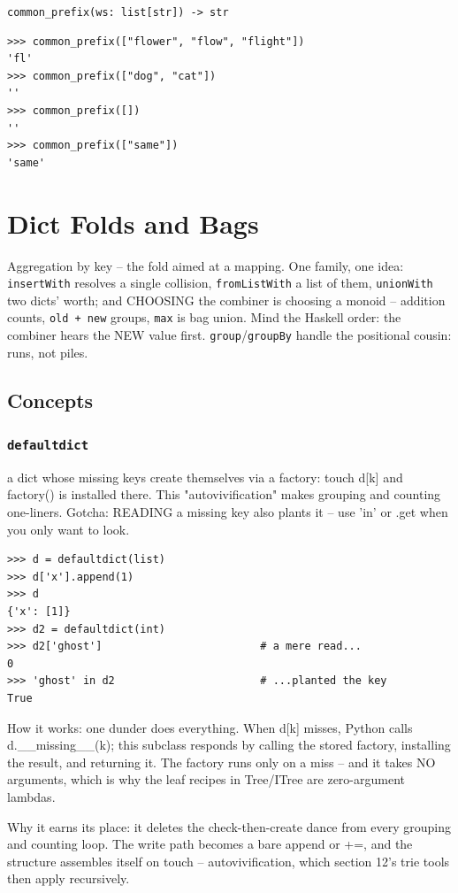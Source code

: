 \documentclass[10pt,letterpaper]{book}
\begin{document}
\noindent\texttt{common\_prefix(ws: list[str]) -> str}
\begin{lstlisting}[style=ex]
>>> common_prefix(["flower", "flow", "flight"])
'fl'
>>> common_prefix(["dog", "cat"])
''
>>> common_prefix([])
''
>>> common_prefix(["same"])
'same'
\end{lstlisting}
\clearpage
\chapter{Dict Folds and Bags}

Aggregation by key -- the fold aimed at a mapping. One family, one idea:
\texttt{insertWith} resolves a single collision, \texttt{fromListWith} a
list of them, \texttt{unionWith} two dicts' worth; and CHOOSING the combiner
is choosing a monoid -- addition counts, \texttt{old + new} groups,
\texttt{max} is bag union. Mind the Haskell order: the combiner hears the
NEW value first. \texttt{group}/\texttt{groupBy} handle the positional
cousin: runs, not piles.
\section{Concepts}
\subsection{\texttt{defaultdict}}\label{def:defaultdict}
a dict whose missing keys create themselves via a factory: touch d[k] and factory() is installed there. This "autovivification" makes grouping and counting one-liners. Gotcha: READING a missing key also plants it -- use 'in' or .get when you only want to look.
\begin{lstlisting}[style=ex]
>>> d = defaultdict(list)
>>> d['x'].append(1)
>>> d
{'x': [1]}
>>> d2 = defaultdict(int)
>>> d2['ghost']                         # a mere read...
0
>>> 'ghost' in d2                       # ...planted the key
True
\end{lstlisting}

How it works: one dunder does everything. When d[k] misses, Python calls d.\_\_missing\_\_(k); this subclass responds by calling the stored factory, installing the result, and returning it. The factory runs only on a miss -- and it takes NO arguments, which is why the leaf recipes in Tree/ITree are zero-argument lambdas.


Why it earns its place: it deletes the check-then-create dance from every grouping and counting loop. The write path becomes a bare append or +=, and the structure assembles itself on touch -- autovivification, which section 12's trie tools then apply recursively.
\end{document}

